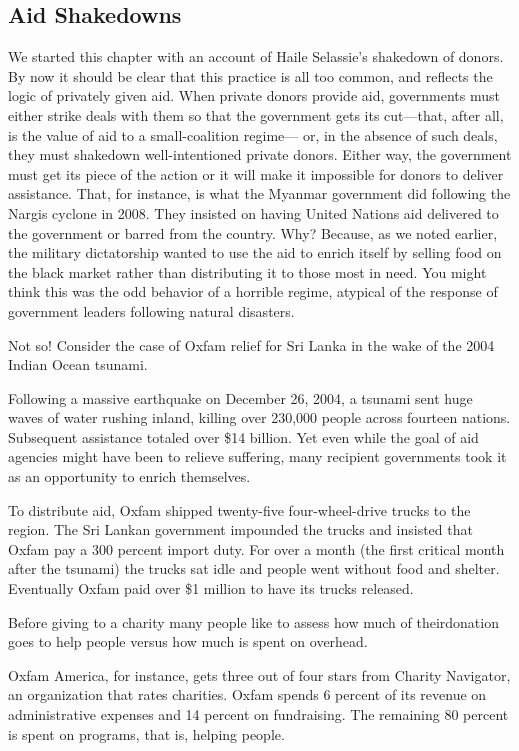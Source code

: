 \documentclass[10pt]{article}
\begin{document}
\subsection{Aid Shakedowns}

{\large We started this chapter with an account of Haile Selassie's shakedown of
donors. By now it should be clear that this practice is all too common, and
reflects the logic of privately given aid. When private donors provide aid,
governments must either strike deals with them so that the government gets its
cut---that, after all, is the value of aid to a small-coalition regime--- or, in
the absence of such deals, they must shakedown well-intentioned private donors.
Either way, the government must get its piece of the action or it will make it
impossible for donors to deliver assistance. That, for instance, is what the
Myanmar government did following the Nargis cyclone in 2008. They insisted on
having United Nations aid delivered to the government or barred from the country.
Why? Because, as we noted earlier, the military dictatorship wanted to use the
aid to enrich itself by selling food on the black market rather than distributing
it to those most in need. You might think this was the odd behavior of a horrible
regime, atypical of the response of government leaders following natural
disasters.}

{\large Not so! Consider the case of Oxfam relief for Sri Lanka in the wake of
the 2004 Indian Ocean tsunami.}

{\large Following a massive earthquake on December 26, 2004, a tsunami sent huge
waves of water rushing inland, killing over 230,000 people across fourteen
nations. Subsequent assistance totaled over \$14 billion. Yet even while the goal
of aid agencies might have been to relieve suffering, many recipient governments
took it as an opportunity to enrich themselves.}

{\large To distribute aid, Oxfam shipped twenty-five four-wheel-drive trucks to
the region. The Sri Lankan government impounded the trucks and insisted that
Oxfam pay a 300 percent import duty. For over a month (the first critical month
after the tsunami) the trucks sat idle and people went without food and shelter.
Eventually Oxfam paid over \$1 million to have its trucks released.}

{\large Before giving to a charity many people like to assess how much of
theirdonation goes to help people versus how much is spent on overhead.}

{\large Oxfam America, for instance, gets three out of four stars from Charity
Navigator, an organization that rates charities. Oxfam spends 6 percent of its
revenue on administrative expenses and 14 percent on fundraising. The remaining
80 percent is spent on programs, that is, helping people.}
\end{document}
